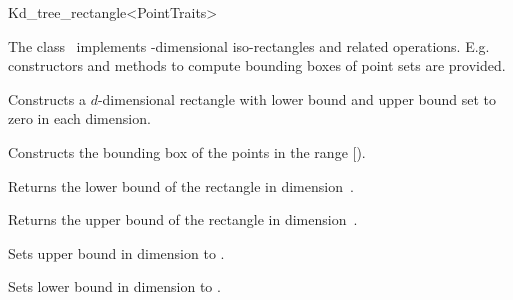 

\begin{ccRefClass}{Kd_tree_rectangle<PointTraits>}  %

\begin{ccAdvanced}


\ccDefinition
  
The class \ccRefName\ implements -dimensional iso-rectangles and related operations.
E.g. constructors and methods to compute bounding boxes of point sets are provided. 



\ccCreation
{}  %

\ccTypes



{Constructs a $d$-dimensional rectangle  with lower bound and upper bound set to zero 
in each dimension.}
 
{Constructs the bounding box of the points in the range [).}

\ccOperations

{Returns the lower bound of the rectangle in dimension~.}

{Returns the upper bound of the rectangle in dimension~.}



{Sets upper bound in dimension  to .}

{Sets lower bound in dimension  to .}
 

\end{ccAdvanced}
\end{ccRefClass}
